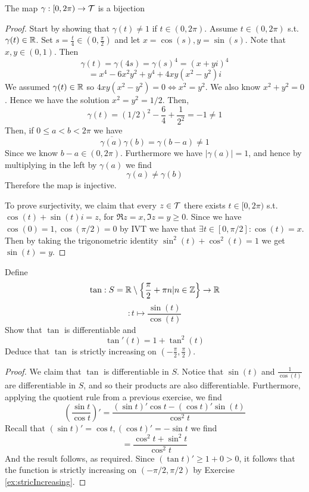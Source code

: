 \begin{theorem}
    The map $\gamma:[0,2\pi)\to\mathcal T$ is a bijection
    \label{<+label+>}
\end{theorem}
\begin{proof}
    Start by showing that $\gamma(t)\neq 1$ if $t\in(0,2\pi)$. Assume $t\in (0,2\pi)$ s.t.
    $\gamma(t)\in\mathbb R$. Set $s=\frac{t}{4}\in(0,\frac{\pi}{2})$ and let
    $x=\cos(s),y=\sin(s)$. Note that $x,y\in(0,1)$. Then
    \[\gamma(t) = \gamma(4s)=\gamma(s)^4 = (x+yi)^4\]
    \[=x^4-6x^2y^2+y^4 + 4xy(x^2-y^2)i\]
    We assumed $\gamma(t)\in\mathbb R$ so $4xy(x^2-y^2)=0 \iff x^2=y^2$. We also know
    $x^2+y^2=0$. Hence we have the solution $x^2=y^2=1/2$. Then,
    \[\gamma(t) = (1/2)^2 - \frac{6}{4} + \frac{1}{2^2} = -1 \neq 1\]
    Then, if $0\leq a<b<2\pi$ we have 
    \[\overline{\gamma(a)}\gamma(b) = \gamma(b-a) \neq 1\]
    Since we know $b-a\in(0,2\pi)$. Furthermore we have $|\gamma(a)|=1$, and hence by
    multiplying in the left by $\gamma(a)$ we find 
    \[\gamma(a)\neq \gamma(b)\]
    Therefore the map is injective. 

    To prove surjectivity, we claim that every $z\in \mathcal T$ there exists $t\in [0,2\pi)$
    s.t. $\cos(t)+\sin(t)i=z$, for $\Re z=x, \Im z= y\geq 0$. Since we have
    $\cos(0)=1,\cos(\pi/2)=0$ by IVT we have that $\exists t\in[0,\pi/2] : \cos(t)=x$.
    Then by taking the trigonometric identity $\sin^2(t)+\cos^2(t)=1$ we get $\sin(t)=y$.
\end{proof}
\begin{exercise}
    Define 
    \[\tan:S=\mathbb R\setminus \left\{ \frac{\pi}{2}+\pi n | n\in\mathbb Z \right\}\to \mathbb R\]
    \[:t\mapsto \frac{\sin(t)}{\cos(t)}\] Show that $\tan$ is differentiable and 
    \[\tan'(t)=1+\tan^2(t)\]
    Deduce that $\tan$ is strictly increasing on $(-\frac{\pi}{2}, \frac{\pi}{2})$.
    \label{ex:tanStrictInc}
\end{exercise}
\begin{proof}
    We claim that $\tan$ is differentiable in $S$. Notice that $\sin(t)$ and
    $\frac{1}{\cos(t)}$ are differentiable in $S$, and so their products are also
    differentiable. Furthermore, applying the quotient rule from a previous exercise, we
    find
    \[\left( \frac{\sin t}{\cos t} \right)'= \frac{(\sin t)' \cos t - (\cos
    t)'\sin(t)}{\cos^2 t}\]
    Recall that $(\sin t)'=\cos t, (\cos t)'=-\sin t$ we find
    \[=\frac{\cos^2t+\sin^2t}{\cos^2t}\]
    And the result follows, as required. Since $(\tan t)'\geq 1+0>0$, it follows that the
    function is strictly increasing on $(-\pi/2,\pi/2)$ by Exercise \ref{ex:stricIncreasing}.
\end{proof}


